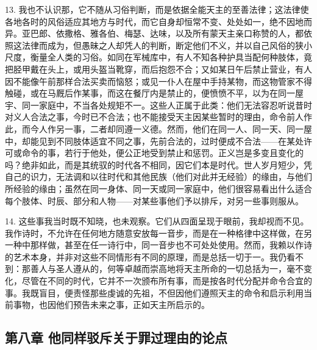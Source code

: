 13. 我也不认识那，它不随从习俗判断，而是依据全能天主的至善法律；这法律使各地各时的风俗适应其地方与时代，而它自身却恒常不变、处处如一，绝不因地而异。亚巴郎、依撒格、雅各伯、梅瑟、达味，以及所有蒙天主亲口称赞的人，都依照这法律而成为，但愚昧之人却凭人的判断，断定他们不义，并以自己风俗的狭小尺度，衡量全人类的习俗。如同在军械库中，有人不知各种护具当配何种肢体，竟把胫甲戴在头上，或用头盔当靴穿，而后抱怨不合；又如某日午后禁止营业，有人因不能像午前那样合法买卖而恼怒；或见一仆人在屋中手持某物，而这物管家不得触碰，或在马厩后作某事，而这在餐厅内是禁止的，便愤愤不平，以为在同一屋宇、同一家庭中，不当各处规矩不一。这些人正属于此类：他们无法容忍听说昔时对义人合法之事，今时已不合法；也不能接受天主因某些暂时的理由，命令前人作此，而今人作另一事，二者却同遵一义德。然而，他们在同一人、同一天、同一屋中，却能见到不同肢体适宜不同之事，先前合法的，过时便成不合法——在某处许可或命令的事，若行于他处，便公正地受到禁止和惩罚。正义岂是多变且变化的吗？绝非如此，而是其统驭的时代各不相同，因它们本是时代。世人岁月短少，凭自己的识力，无法调和以往时代和其他民族（他们对此并无经验）的缘由，与他们所经验的缘由；虽然在同一身体、同一天或同一家庭中，他们很容易看出什么适合每个肢体、时辰、部分和人物——对某些事他们予以排斥，对另一些事则服从。\par

14. 这些事我当时既不知晓，也未观察。它们从四面呈现于眼前，我却视而不见。我作诗时，不允许在任何地方随意安放每一音步，而是在一种格律中这样做，在另一种中那样做，甚至在任一诗行中，同一音步也不可处处使用。然而，我赖以作诗的艺术本身，并非对这些不同情形有不同的原理，而是总括一切于一。我仍看不到：那善人与圣人遵从的，何等卓越而崇高地将天主所命的一切总括为一，毫不变化，尽管在不同的时代，它并不一次颁布所有事，而是按各时代分配并命令合宜的事。我既盲目，便责怪那些虔诚的先祖，不但因他们遵照天主的命令和启示利用当前事物，也因他们预告未来之事，正如天主所启示的。\par


\subsection{第八章 他同样驳斥关于罪过理由的论点}

